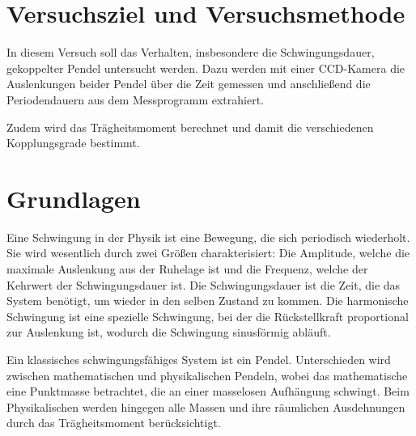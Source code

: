 \documentclass[12pt,a4paper]{scrartcl}
\begin{document}
\thispagestyle{empty}



\thispagestyle{empty}

\tableofcontents

\clearpage %

\renewcommand{\thepage}{\arabic{page}}
\setcounter{page}{1}


\section[Versuchsziel]{Versuchsziel und Versuchsmethode}

In diesem Versuch soll das Verhalten, insbesondere die Schwingungsdauer, gekoppelter Pendel untersucht werden. Dazu werden mit einer CCD-Kamera die Auslenkungen beider Pendel über die Zeit gemessen und anschließend die Periodendauern aus dem Messprogramm extrahiert.

Zudem wird das Trägheitsmoment berechnet und damit die verschiedenen Kopplungsgrade bestimmt.

\section{Grundlagen}

Eine Schwingung in der Physik ist eine Bewegung, die sich periodisch wiederholt. Sie wird wesentlich durch zwei Größen charakterisiert: Die Amplitude, welche die maximale Auslenkung aus der Ruhelage ist und die Frequenz, welche der Kehrwert der Schwingungsdauer ist. Die Schwingungsdauer ist die Zeit, die das System benötigt, um wieder in den selben Zustand zu kommen. Die harmonische Schwingung ist eine spezielle Schwingung, bei der die Rückstellkraft proportional zur Auslenkung ist, wodurch die Schwingung sinusförmig abläuft.

Ein klassisches schwingungsfähiges  System ist ein Pendel. Unterschieden wird zwischen mathematischen und physikalischen Pendeln, wobei das mathematische eine Punktmasse betrachtet, die an einer masselosen Aufhängung schwingt. Beim Physikalischen werden hingegen alle Massen und ihre räumlichen Ausdehnungen durch das Trägheitsmoment berücksichtigt.
\end{document}
